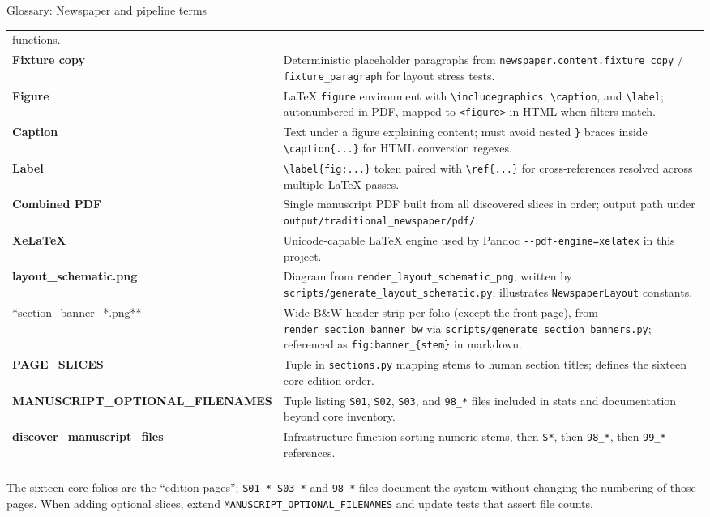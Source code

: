 \documentclass[
  ignorenonframetext,
]{beamer}
\begin{document}
\begin{frame}[fragile]{Glossary: Newspaper and pipeline terms}
{\begin{longtable}[]{@{}
  >{\raggedright\arraybackslash}p{}
  >{\raggedright\arraybackslash}p{}@{}}
functions. \\
\textbf{Fixture copy} & Deterministic placeholder paragraphs from
\texttt{newspaper.content.fixture\_copy} / \texttt{fixture\_paragraph}
for layout stress tests. \\
\textbf{Figure} & LaTeX \texttt{figure} environment with
\texttt{\textbackslash{}includegraphics},
\texttt{\textbackslash{}caption}, and \texttt{\textbackslash{}label};
autonumbered in PDF, mapped to \texttt{\textless{}figure\textgreater{}}
in HTML when filters match. \\
\textbf{Caption} & Text under a figure explaining content; must avoid
nested \texttt{\}} braces inside \texttt{\textbackslash{}caption\{...\}}
for HTML conversion regexes. \\
\textbf{Label} & \texttt{\textbackslash{}label\{fig:...\}} token paired
with \texttt{\textbackslash{}ref\{...\}} for cross-references resolved
across multiple LaTeX passes. \\
\textbf{Combined PDF} & Single manuscript PDF built from all discovered
slices in order; output path under
\texttt{output/traditional\_newspaper/pdf/}. \\
\textbf{XeLaTeX} & Unicode-capable LaTeX engine used by Pandoc
\texttt{-\/-pdf-engine=xelatex} in this project. \\
\textbf{layout\_schematic.png} & Diagram from
\texttt{render\_layout\_schematic\_png}, written by
\texttt{scripts/generate\_layout\_schematic.py}; illustrates
\texttt{NewspaperLayout} constants. \\
**section\_banner\_*.png** & Wide B\&W header strip per folio (except
the front page), from \texttt{render\_section\_banner\_bw} via
\texttt{scripts/generate\_section\_banners.py}; referenced as
\texttt{fig:banner\_\{stem\}} in markdown. \\
\textbf{PAGE\_SLICES} & Tuple in \texttt{sections.py} mapping stems to
human section titles; defines the sixteen core edition order. \\
\textbf{MANUSCRIPT\_OPTIONAL\_FILENAMES} & Tuple listing \texttt{S01},
\texttt{S02}, \texttt{S03}, and \texttt{98\_*} files included in stats
and documentation beyond core inventory. \\
\textbf{discover\_manuscript\_files} & Infrastructure function sorting
numeric stems, then \texttt{S*}, then \texttt{98\_*}, then
\texttt{99\_*} references. \\
\bottomrule\noalign{}
\end{longtable}
}

The sixteen core folios are the ``edition pages'';
\texttt{S01\_*}--\texttt{S03\_*} and \texttt{98\_*} files document the
system without changing the numbering of those pages. When adding
optional slices, extend \texttt{MANUSCRIPT\_OPTIONAL\_FILENAMES} and
update tests that assert file counts.


\end{frame}
\end{document}
